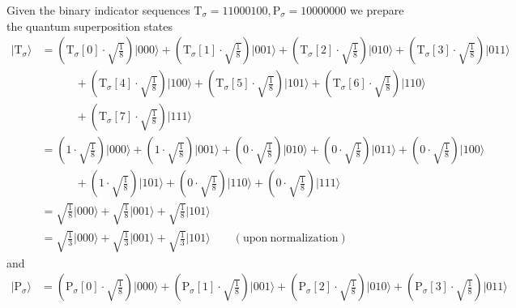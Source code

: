 \begin{example}
\label{exa:arbitrary-superposition}
Given the binary indicator sequences $\mathrm{T}_{\sigma} = 11000100, \mathrm{P}_{\sigma} = 10000000$ we prepare the quantum superposition states
\begin{align*}
	\vert \mathrm{T}_{\sigma} \rangle &= \left(\mathrm{T}_{\sigma}[0] \cdot \sqrt{\frac{1}{8}}\right) \vert 000 \rangle + \left(\mathrm{T}_{\sigma}[1] \cdot \sqrt{\frac{1}{8}}\right) \vert 001 \rangle + \left(\mathrm{T}_{\sigma}[2] \cdot \sqrt{\frac{1}{8}}\right) \vert 010 \rangle + \left(\mathrm{T}_{\sigma}[3] \cdot \sqrt{\frac{1}{8}}\right) \vert 011 \rangle\\
	\quad & \quad \quad \quad  + \left(\mathrm{T}_{\sigma}[4] \cdot \sqrt{\frac{1}{8}}\right) \vert 100 \rangle + \left(\mathrm{T}_{\sigma}[5] \cdot \sqrt{\frac{1}{8}}\right) \vert 101 \rangle + \left(\mathrm{T}_{\sigma}[6] \cdot \sqrt{\frac{1}{8}}\right) \vert 110 \rangle\\
	\quad & \quad \quad \quad  + \left(\mathrm{T}_{\sigma}[7] \cdot \sqrt{\frac{1}{8}}\right) \vert 111 \rangle \\
	\quad &= \left( 1 \cdot \sqrt{\frac{1}{8}}\right) \vert 000 \rangle + \left( 1 \cdot \sqrt{\frac{1}{8}} \right) \vert 001 \rangle + \left( 0 \cdot \sqrt{\frac{1}{8}}\right) \vert 010 \rangle + \left(0 \cdot \sqrt{\frac{1}{8}}\right) \vert 011 \rangle  + \left( 0 \cdot \sqrt{\frac{1}{8}} \right) \vert 100 \rangle\\
	\quad & \quad \quad \quad + \left(1 \cdot \sqrt{\frac{1}{8}}\right) \vert 101 \rangle + \left( 0 \cdot \sqrt{\frac{1}{8}}\right) \vert 110 \rangle + \left(0 \cdot \sqrt{\frac{1}{8}}\right) \vert 111 \rangle \\
	\quad &= \sqrt{\frac{1}{8}} \vert 000 \rangle + \sqrt{\frac{1}{8}} \vert 001 \rangle + \sqrt{\frac{1}{8}} \vert 101 \rangle\\
	\quad &= \sqrt{\frac{1}{3}} \vert 000 \rangle + \sqrt{\frac{1}{3}} \vert 001 \rangle + \sqrt{\frac{1}{3}} \vert 101 \rangle \quad\quad\mathrm{(upon\ normalization)}
\end{align*}
and
\begin{align*}
	\vert \mathrm{P}_{\sigma} \rangle &= \left(\mathrm{P}_{\sigma}[0] \cdot \sqrt{\frac{1}{8}}\right) \vert 000 \rangle + \left(\mathrm{P}_{\sigma}[1] \cdot \sqrt{\frac{1}{8}}\right) \vert 001 \rangle + \left(\mathrm{P}_{\sigma}[2] \cdot \sqrt{\frac{1}{8}}\right) \vert 010 \rangle + \left(\mathrm{P}_{\sigma}[3] \cdot \sqrt{\frac{1}{8}}\right) \vert 011 \rangle\\

\end{align*}
\end{example}

